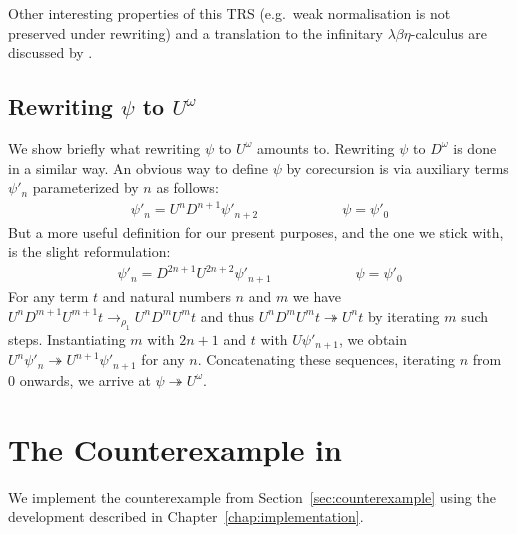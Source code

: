 Other interesting properties of this TRS (e.g.\ weak normalisation is
not preserved under rewriting) and a translation to the infinitary
$\lambda \beta \eta$-calculus are discussed by \citet{endrullis-10}.


\subsection{\texorpdfstring{Rewriting $\psi$ to $U^\omega$}{Rewriting
    DUUDDD... to UUU...}}\label{sub:counterexample}

We show briefly what rewriting $\psi$ to $U^\omega$ amounts
to. Rewriting $\psi$ to $D^\omega$ is done in a similar way.
An obvious way to define $\psi$ by corecursion is via auxiliary terms
$\psi'_n$ parameterized by $n$ as follows:
\begin{align*}
  \psi'_n = U^n D^{n + 1} \psi'_{n + 2} \qquad \qquad \qquad
  \psi = \psi'_0
\end{align*}
But a more useful definition for our present purposes, and the one we
stick with, is the slight reformulation:
\begin{align*}
  \psi'_n = D^{2 n + 1} U^{2 n + 2} \psi'_{n + 1} \qquad
  \qquad \qquad
  \psi = \psi'_0
\end{align*}
For any term $t$ and natural numbers $n$ and $m$ we have $U^n D^{m+1}
U^{m+1} t \rightarrow_{\rho_1} U^n D^m U^m t$ and thus $U^n D^m U^m t
\twoheadrightarrow U^n t$ by iterating $m$ such steps. Instantiating
$m$ with $2 n + 1$ and $t$ with $U \psi'_{n + 1}$, we obtain
$U^n \psi'_n \twoheadrightarrow U^{n+1} \psi'_{n + 1}$ for any $n$.
Concatenating these sequences, iterating $n$ from $0$ onwards, we
arrive at $\psi \twoheadrightarrow U^\omega$.


\section{The Counterexample in \Coq}

We implement the counterexample from Section~\ref{sec:counterexample}
using the \Coq development described in
Chapter~\ref{chap:implementation}.

